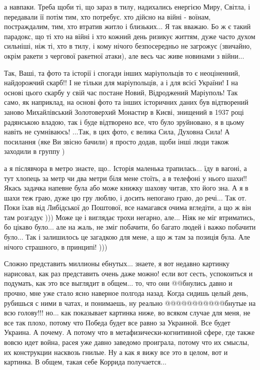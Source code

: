 а навпаки. Треба щоби ті, що зараз в тилу, надихались енергією Миру, Світла, і
передавали її потім тим, хто потребує. хто дійсно на війні - воїнам,
постраждалим, тим, хто втратив житло і близьких... Я так вважаю. Бо ж є такий
парадокс, що ті хто на війні і хто кожний день ризикує життям, дуже часто духом
сильніші, ніж ті, хто в тилу, і кому нічого безпосередньо не загрожує
(звичайно, окрім ракети з чергової ракетної атаки), але весь час живе новинами
з війни... 



Так, Ваші, та фото та історії і спогади інших маріупольців то є неоціненний,
найдорожчий скарб!! І не тільки для маріупольців, а і для всієї України! І на
основі цього скарбу у свій час постане Новий, Відроджений Маріуполь! Так само,
як наприклад, на основі фото та інших історичних даних був відтворений заново
Михайлівський Золотоверхий Монастир в Києві, знищений в 1937 році радянською
владою, так і буде відтворено все, что було зруйновано, я в цьому навіть не
сумніваюсь! ...Так, в цих фото, є велика Сила, Духовна Сила! А посилання (яке
Ви звісно бачили) я просто додав, щоби інші люди також заходили в группу )

а я післявчора в метро знаєте, що.. Історія маленька трапилась... їду в вагоні,
а тут хлопець за метр чи два метри біля мене стоїть, а в телефоні у нього
шахи!! Якась задачка напевне була або може книжку шахову читав, хто його зна. А
я в шахи теж граю, дуже цю гру люблю, і досить непогано граю, до речі... Так
от. Поки їхав від Либідської до Поштової, все намагався очима вгледіти, а що ж
він там розгадує ))) Може це і виглядає трохи негарно, але... Ніяк не міг
втриматись, бо цікаво було... але на жаль, не зміг побачити, бо багато людей і
важко побачити було... Так і залишилось це загадкою для мене, а що ж там за
позиція була. Але нічого страшного, в принципі! )))


Сложно представить миллионы ебнутых... знаете, я вот недавно картинку
нарисовал, как раз представить очень даже можно! если вот сесть, успокоиться и
подумать, как это все выглядит в общем... то, что они @@бнулись давно и прочно,
мне уже стало ясно наверное полгода назад. Когда сидишь целый день, рубишься с
ними в чатах, и понимаешь, ну реально @@@@@@@@@@@бнутые на всю голову!!! но...
как показывает картинка ниже, во всяком случае для меня, не все так плохо,
потому что Победа будет все равно за Украиной. Все будет Украина. А почему. А
потому что в метафизически-когнитивной сфере, где также вовсю идет война, расея
уже давно заведомо проиграла, потому что их смыслы, их конструкции насквозь
гнилые. Ну а как я вижу все это в целом, вот и  картинка. В общем, такая себе
Коррида получается...


